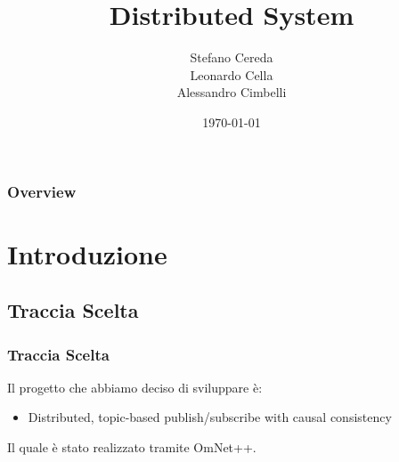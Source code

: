\documentclass{beamer}
\title[Distributed System]{Distributed System} %
\author[Cereda Cella Cimbelli]{Stefano Cereda\\ Leonardo Cella\\ Alessandro Cimbelli} %
\institute[Polimi] %
{
Politecnico di Milano \\ %
\medskip
\textit{} %
}
\date{\today} %
\begin{document}
\begin{frame}
\titlepage %
\end{frame}

\begin{frame}
\frametitle{Overview} %
\tableofcontents %
\end{frame}


\section{Introduzione} %

\subsection{Traccia Scelta} %

\begin{frame}
	\frametitle{Traccia Scelta}
	
	Il progetto che abbiamo deciso di sviluppare è:
	\begin{itemize}
		\item Distributed, topic-based publish/subscribe with causal consistency
	\end{itemize}
	
	Il quale è stato realizzato tramite OmNet++.
	
\end{frame}
\end{document}
